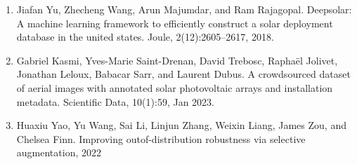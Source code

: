 \documentclass[final]{beamer}
\newlength{\sepwidth}
\newlength{\colwidth}
\newcommand{\separatorcolumn}{\begin{column}{\sepwidth}\end{column}}
\begin{document}
\begin{frame}[t]
\begin{columns}[t]
\begin{column}{\colwidth}
\end{column}

\separatorcolumn
\end{columns}
\begin{alertblock}
\footnotesize
\begin{enumerate}
\item Jiafan Yu, Zhecheng Wang, Arun Majumdar, and Ram Rajagopal. Deepsolar: A machine learning framework to efficiently construct a solar deployment database in the united states. Joule, 2(12):2605–2617, 2018.  \\
\item Gabriel Kasmi, Yves-Marie Saint-Drenan, David Trebosc, Raphaël Jolivet, Jonathan Leloux, Babacar Sarr, and Laurent Dubus. A crowdsourced dataset of aerial images with annotated solar photovoltaic arrays and installation metadata. Scientific Data, 10(1):59, Jan 2023.\\
\item Huaxiu Yao, Yu Wang, Sai Li, Linjun Zhang, Weixin Liang, James Zou, and Chelsea Finn. Improving outof-distribution robustness via selective augmentation, 2022
\end{enumerate}
\end{alertblock}



\end{frame}
\end{document}

